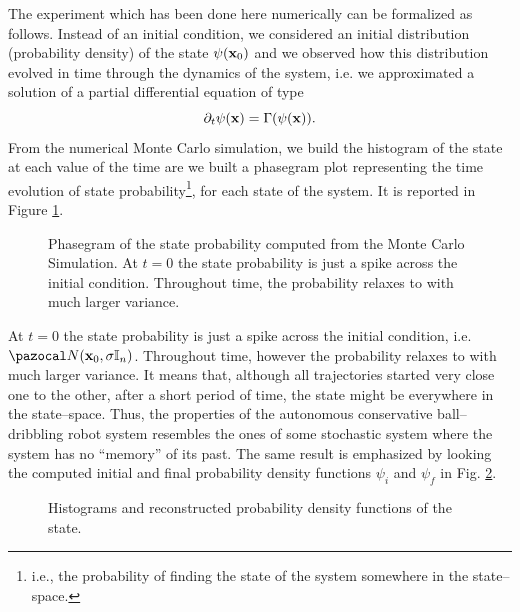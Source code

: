 %
The experiment which has been done here numerically can be formalized as follows.
Instead of an initial condition, we considered an initial distribution (probability density) of the state $\psi(\mathbf{x}_0)$ and we observed how this distribution evolved in time through the dynamics of the system, i.e. we approximated a solution of a partial differential equation of type
%
\begin{equation}
    \partial_t\psi(\mathbf{x}) = \Gamma(\psi(\mathbf{x})).
\end{equation}
%
From the numerical Monte Carlo simulation, we build the histogram of the state at each value of the time are we built a phasegram plot representing the time evolution of state probability\footnote{i.e., the probability of finding the state of the system somewhere in the state--space.}, for each state of the system. It is reported in Figure \ref{fig:phasegram}. 
%
\begin{figure}[h]
    \centering
    \caption[Phasegram of the state probability function]{Phasegram of the state probability computed from the Monte Carlo Simulation. At $t=0$ the state probability is just a spike across the initial condition. Throughout time, the probability relaxes to with much larger variance.}
    \label{fig:phasegram}
\end{figure}
%
At $t=0$ the state probability is just a spike across the initial condition, i.e. $\N(\xb_0,\sigma\mathbb{I}_n)$. Throughout time, however the probability relaxes to with much larger variance. It means that, although all trajectories started very close one to the other, after a short period of time, the state might be everywhere in the state--space. Thus, the properties of the autonomous conservative ball--dribbling robot system resembles the ones of some stochastic system where the system has no ``memory'' of its past.
The same result is emphasized by looking the computed initial and final probability density functions $\psi_i$ and $\psi_f$ in Fig. \ref{fig:hist}.
%
\begin{figure}[h]
    \centering
    \caption{Histograms and reconstructed probability density functions of the state.}
    \label{fig:hist}
\end{figure}
%

